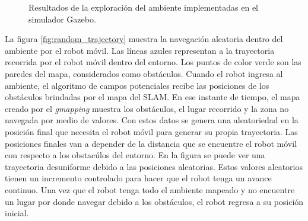 \begin{figure}[ht!]
     \begin{center}
    \end{center}
  \captionsetup{font=footnotesize}
    \caption{\label{fig:Gazebo_explora}Resultados de la exploración del ambiente implementadas en el simulador Gazebo.}
\end{figure} 

La figura \ref{fig:random_trajectory} muestra la navegación aleatoria dentro del ambiente por el 
robot móvil. Las líneas azules representan a la trayectoria recorrida por el robot 
móvil dentro del entorno. Los puntos de color verde son las paredes del mapa, considerados
como obstáculos. Cuando el robot ingresa al ambiente, el algoritmo de campos potenciales recibe 
las posiciones de los obstáculos brindadas por el mapa del SLAM. En ese instante de tiempo, el 
mapa creado por el \textit{gmapping} muestra los obstáculos, el lugar recorrido y la zona 
no navegada por medio de valores. Con estos datos se genera una aleatoriedad en la posición final
que necesita el robot móvil para generar su propia trayectoria. Las posiciones finales van a depender
de la distancia que se encuentre el robot móvil con respecto a los obstacúlos del entorno. En la 
figura se puede ver una trayectoria desuniforme debido a las posiciones aleatorias. Estos valores
aleatorios tienen un incremento controlado para hacer que el robot tenga un avance continuo. Una
vez que el robot tenga todo el ambiente mapeado y no encuentre un lugar por donde navegar debido
a los obstáculos, el robot regresa a su posición inicial.
